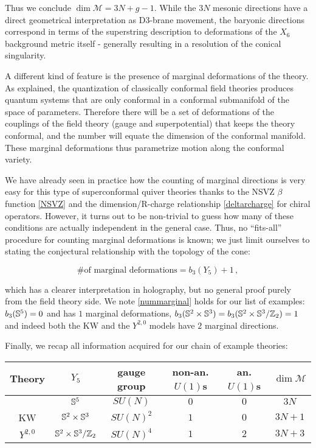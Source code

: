 Thus we conclude $\dim \mathcal M = 3N + g - 1$. While the $3N$ mesonic directions have a direct geometrical interpretation as D3-brane movement, the baryonic directions correspond in terms of the superstring description to deformations of the $X_6$ background metric itself - generally resulting in a resolution of the conical singularity.

A different kind of feature is the presence of marginal deformations of the theory. As explained, the quantization of classically conformal field theories produces quantum systems that are only conformal in a conformal submanifold of the space of parameters. Therefore there will be a set of deformations of the couplings of the field theory (gauge and superpotential) that keeps the theory conformal, and the number will equate the dimension of the conformal manifold. These marginal deformations thus parametrize motion along the conformal variety. 

We have already seen in practice how the counting of marginal directions is very easy for this type of superconformal quiver theories thanks to the NSVZ $\beta$ function \eqref{NSVZ} and the dimension/R-charge relationship \eqref{deltarcharge} for chiral operators. However, it turns out to be non-trivial to guess how many of these conditions are actually independent in the general case. Thus, no ``fits-all'' procedure for counting marginal deformations is known; we just limit ourselves to stating the conjectural relationship with the topology of the cone:

\begin{equation}
	\text{\# of marginal deformations} = b_3(Y_5) + 1\,,
	\label{nummarginal}
\end{equation}

which has a clearer interpretation in holography, but no general proof purely from the field theory side. We note \eqref{nummarginal} holds for our list of examples: $b_3(\mathbb{S}^5) = 0$ and \SYM has $1$ marginal deformations, $b_3(\mathbb{S}^2 \times \mathbb{S}^3) = {b_3(\mathbb{S}^2 \times \mathbb{S}^3 / \mathbb{Z}_2)} = 1$ and indeed both the KW and the $Y^{2,0}$ models have $2$ marginal directions.

Finally, we recap all information acquired for our chain of example theories:

\begin{center}
	\begin{tabular}[]{cccccc}
Theory & $Y_5$	& gauge group &non-an. $U(1)$s & an. $U(1)$s & $\dim \mathcal{M}$ \\	\midrule \midrule
\SYM	& 	$\mathbb{S}^5$   & $SU(N)$	& $0$	 & $0$  & $3N$ \\
KW	& 	$\mathbb{S}^2\times\mathbb{S}^3$   & $SU(N)^2$	& $1$	 & $0$  & $3N+1$ \\
$Y^{2,0}$	& 	$\mathbb{S}^2\times\mathbb{S}^3/\mathbb{Z}_2$   & $SU(N)^4$	& $1$	 & $2$  & $3N+3$ \\
	\end{tabular}
\end{center}
